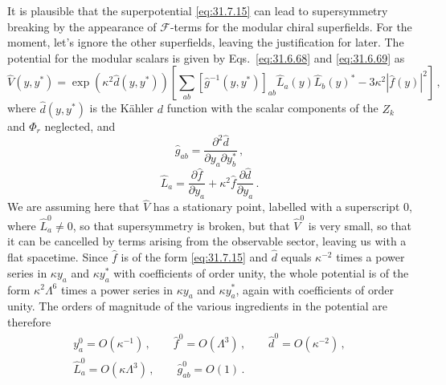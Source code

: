 It is plausible that the superpotential \eqref{eq:31.7.15} can lead to
supersymmetry breaking by the appearance of \(\mathcal F\)-terms for the
modular chiral superfields. For the moment, let's ignore the other
superfields, leaving the justification for later. The potential for the
modular scalars is given by Eqs.~\eqref{eq:31.6.68} and
\eqref{eq:31.6.69} as
\begin{equation}
  \widehat V(y,y^*)
  =\exp\left(\kappa^2\widehat d(y,y^*)\right)
  \left[
    \sum_{ab}[\widehat g^{-1}(y,y^*)]_{ab}
      \widehat L_a(y)\widehat L_b(y)^*
    -3\kappa^2|\widehat f(y)|^2
  \right]\,,
  \tag{31.7.16}\label{eq:31.7.16}
\end{equation}
where \(\widehat d(y,y^*)\) is the Kähler \(d\) function with the scalar
components of the \(Z_k\) and \(\Phi_r\) neglected, and
\begin{equation}
  \widehat g_{ab}
  =\frac{\partial^2\widehat d}{\partial y_a\partial y_b^*}\,,
  \tag{31.7.17}\label{eq:31.7.17}
\end{equation}
\begin{equation}
  \widehat L_a
  =\frac{\partial\widehat f}{\partial y_a}
   +\kappa^2\widehat f\frac{\partial\widehat d}{\partial y_a}\,.
  \tag{31.7.18}\label{eq:31.7.18}
\end{equation}
We are assuming here that \(\widehat V\) has a stationary point, labelled
with a superscript 0, where \(\widehat L_a^0\ne0\), so that supersymmetry is
broken, but that \(\widehat V^0\) is very small, so that it can be cancelled
by terms arising from the observable sector, leaving us with a flat
spacetime. Since \(\widehat f\) is of the form \eqref{eq:31.7.15} and
\(\widehat d\) equals \(\kappa^{-2}\) times a power series in \(\kappa y_a\)
and \(\kappa y_a^*\) with coefficients of order unity, the whole potential
is of the form \(\kappa^2\Lambda^6\) times a power series in \(\kappa y_a\)
and \(\kappa y_a^*\), again with coefficients of order unity. The orders of
magnitude of the various ingredients in the potential are therefore
\begin{equation}
  \begin{gathered}
  y_a^0=O(\kappa^{-1})\,,\qquad
  \widehat f^0=O(\Lambda^3)\,,\qquad
  \widehat d^0=O(\kappa^{-2})\,,
  \\
  \widehat L_a^0=O(\kappa\Lambda^3)\,,\qquad
  \widehat g_{ab}^0=O(1)\,.
  \end{gathered}
  \tag{31.7.19}\label{eq:31.7.19}
\end{equation}

